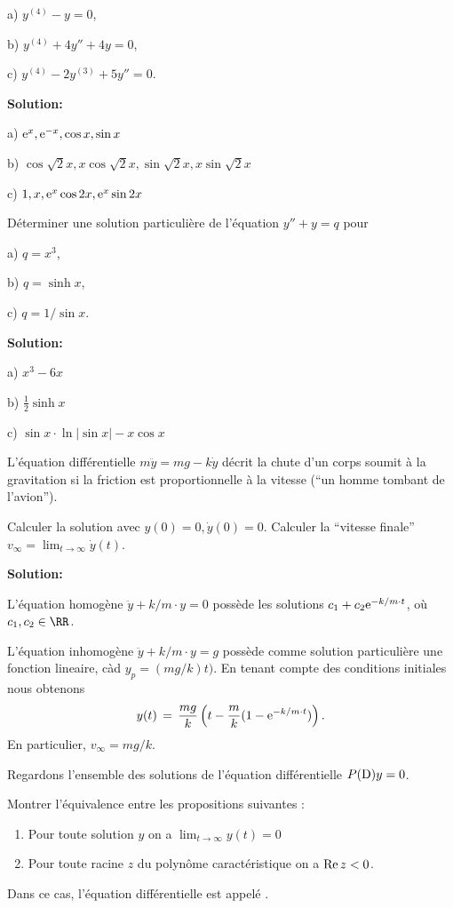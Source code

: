 \medskip
a) $y^{(4)}-y = 0$,

\medskip
b) $y^{(4)} +4y'' +4y = 0$,

\medskip
c) $y^{(4)} -2y^{(3)} +5y'' = 0$.


\bigskip
{\bf Solution:}

\medskip
a) ${\rm e}^x, {\rm e}^{-x}, \cos x, \sin x$

\medskip
b) $\cos \sqrt{2} x, x \cos \sqrt{2}x, \sin \sqrt{2}x, x \sin \sqrt{2}x$

\medskip
c)
$1, x, {\rm e}^x \cos 2x, {\rm e}^x \sin 2x$



\bigskip
\exerNico 
Déterminer une solution particulière de l'équation
$y''+y=q$ pour

\medskip
a) $q = x^3$,

\medskip
b) $q = \sinh x$,

\medskip
c) $q = 1/\sin x$.
 

\bigskip
{\bf Solution:}

\medskip
a) $x^3 - 6 x$

\medskip
b) $\frac 12 \sinh x$

\medskip
c) $\sin x \cdot \ln |\sin x| - x \cos x$


\bigskip
\exerNico  
L'équation différentielle $m \ddot y = mg - k\dot y$ 
décrit la chute d'un corps soumit
à la gravitation si la friction est proportionnelle à la vitesse (``un homme tombant de l'avion'').

\medskip
Calculer la solution avec $y(0) =0, \dot y(0) = 0$.
Calculer la ``vitesse finale'' $v_\infty = \displaystyle \lim_{t \to \infty} \dot y (t)$.



\bigskip
{\bf Solution:}

\medskip
L'équation homogène $\ddot y + k/m \cdot y = 0$
possède les solutions $c_1+c_2 {\rm e}^{-k/m \cdot t}$,
où $c_1, c_2 \in \RR$.
 
L'équation inhomogène $\ddot y + k/m \cdot y = g$
possède comme solution particulière une fonction lineaire, càd 
$y_p = (mg/k)t)$.
En tenant compte des conditions initiales nous obtenons
$$
y(t) \,=\, \frac{mg}{k} \left( t-\frac mk (1-{\rm e}^{-k/m \cdot t})\right).
$$
En particulier, $v_\infty = mg/k$. 

 




\bigskip
\exerNico  
Regardons l'ensemble des solutions de l'équation différentielle $P({\rm D})y =0$.

Montrer l'équivalence entre les propositions suivantes :
\begin{enumerate}

\item
Pour toute solution $y$ on a $\displaystyle \lim_{t \to \infty} y(t) = 0$

\item
Pour toute racine $z$ du polynôme caractéristique on a ${\rm Re}\, z <0$.

\end{enumerate}
Dans ce cas, l'équation différentielle est appelé  .

